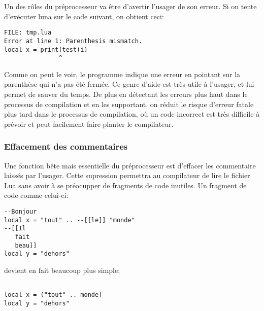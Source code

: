 \documentclass{article}
\begin{document}
Un des rôles du préprocesseur va être d'avertir l'usager de son erreur. Si on tente d'exécuter luna sur le code suivant, on obtient ceci:
\lstset{style = out}
\begin{lstlisting}
FILE: tmp.lua
Error at line 1: Parenthesis mismatch.
local x = print(test(i)
               ^
\end{lstlisting}
Comme on peut le voir, le programme indique une erreur en pointant sur la parenthèse qui n'a pas été fermée. Ce genre d'aide est très utile à l'usager, et lui permet de sauver du temps. De plus en détectant les erreurs plus haut dans le processus de compilation et en les supportant, on réduit le risque d'erreur fatale plus tard dans le processus de compilation, où un code incorrect est très difficile à prévoir et peut facilement faire planter le compilateur.

\subsubsection{Effacement des commentaires}
Une fonction bête mais essentielle du préprocesseur est d'effacer les commentaire laissés par l'usager. Cette supression permettra au compilateur de lire le fichier Lua sans avoir à se préocupper de fragments de code inutiles. Un fragment de code comme celui-ci:
\lstset{style = lua}
\begin{lstlisting}[caption={Commentaires multiples},label=DescriptiveLabel]
--Bonjour
local x = "tout" .. --[[le]] "monde"
--[[Il
   fait
   beau]]
local y = "dehors"
\end{lstlisting}

\newpage
devient en fait beaucoup plus simple:
\begin{lstlisting}[belowcaptionskip = -1\baselineskip]

local x = ("tout" .. monde) 
local y = "dehors"
\end{lstlisting}
\end{document}
